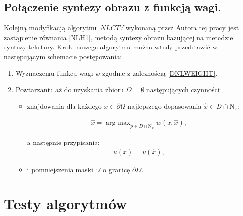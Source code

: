 \documentclass[12pt, twoside, openany]{report}
\theoremstyle{definition}
\begin{document}
\section{Połączenie syntezy obrazu z funkcją wagi.}
Kolejną modyfikacją algorytmu $NLCTV$ wykonaną przez Autora tej pracy jest zastąpienie równania \eqref{NLH1}, metodą syntezy obrazu bazującej na metodzie syntezy tekstury. Kroki nowego algorytmu można wtedy przedstawić w następującym schemacie postępowania:
\begin{enumerate}
\item
Wyznaczeniu funkcji wagi $w$ zgodnie z zależnością \eqref{DNLWEIGHT}.
\item
Powtarzaniu aż do uzyskania zbioru $\Omega = \emptyset$ następujących czynności:
\begin{itemize}
\item
znajdowania dla każdego $x \in \partial\Omega$ najlepszego dopasowania $\hat{x} \in D \cap \mathrm{N}_x$:
\begin{large}
\begin{align}
\hat{x} = \mathop{\mathrm{arg \ max}}_{p \in D \cap \mathrm{N}_x} w(x,\hat{x}),
\end{align}
\end{large}
a następnie przypisania:
\begin{align}
u(x) = \hat{u}(\hat{x}),
\end{align}
\item
i pomniejszenia maski $\Omega$ o granicę $\partial\Omega$.
\end{itemize}
\end{enumerate}
\chapter{Testy algorytmów}
\end{document}
